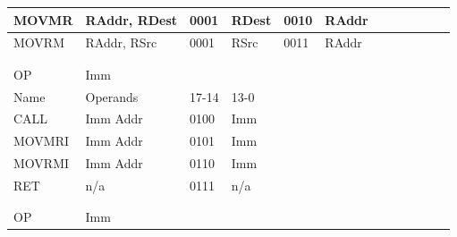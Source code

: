 \documentclass[a4paper]{article}
\begin{document}
\begin{tabular}{|l|l|l|l|l|l|l|l|l|l|l|l|}
\hline
{} MOVMR&RAddr, RDest&0001&RDest&0010&RAddr&&&&
&&\\
\hline
MOVRM&RAddr, RSrc&0001&RSrc&0011&RAddr&&&&
&&\\
\hline
{} &&&&&&&&&
&&\\
\hline
&&&&&&&&&
&&\\
\hline
{} OP&Imm&&&&&&&&
&&\\
\hline
Name&Operands&17-14&13-0&&&&&&
&&\\
\hline
{} CALL&Imm Addr&0100&Imm&&&&&&
&&\\
\hline
MOVMRI&Imm Addr&0101&Imm&&&&&&
&&\\
\hline
{} MOVRMI&Imm Addr&0110&Imm&&&&&&
&&\\
\hline
RET&n/a&0111&n/a&&&&&&
&&\\
\hline
{} &&&&&&&&&
&&\\
\hline
&&&&&&&&&
&&\\
\hline
{} OP&Imm&&&&&&&&
&&\\
\hline
\end{tabular}
\newline
\end{document}
